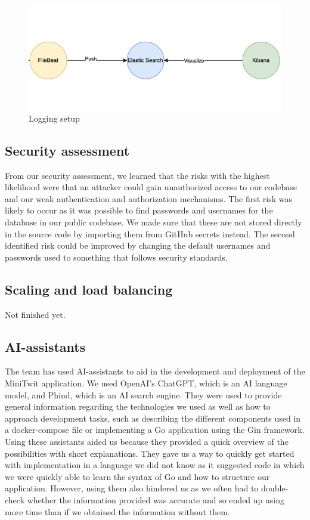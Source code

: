 \begin{figure}[H]
    \centering
    \captionsetup{justification=centering,margin=1cm}
    \includegraphics[width=0.8\linewidth]{report/images/logging.png}
    \caption{Logging setup}
    \label{fig:logging}
\end{figure}

\subsection{Security assessment}
From our security assessment, we learned that the risks with the highest likelihood were that an attacker could gain unauthorized access to our codebase
and our weak authentication and authorization mechanisms. The first risk was likely to occur as it was possible to find passwords and usernames for the database 
in our public codebase. We made sure that these are not stored directly in the source code by importing them from GitHub secrets instead. The second identified 
risk could be improved by changing the default usernames and passwords used to something that follows security standards.  

\subsection{Scaling and load balancing}
Not finished yet.

\subsection{AI-assistants}
The team has used AI-assistants to aid in the development and deployment of the MiniTwit application. We used OpenAI's ChatGPT, which is an AI language model, 
and Phind, which is an AI search engine. They were used to provide general information regarding the technologies we used as well as how to approach development tasks,
such as describing the different components used in a docker-compose file or implementing a Go application using the Gin framework. \\
  
Using these assistants aided us because they provided a quick overview of the possibilities with short explanations. They gave us a way to quickly get started with
implementation in a language we did not know as it suggested code in which we were quickly able to learn the syntax of Go and how to structure our application. However, 
using them also hindered us as we often had to double-check whether the information provided was accurate and so ended up using more time than if we obtained the information 
without them. 